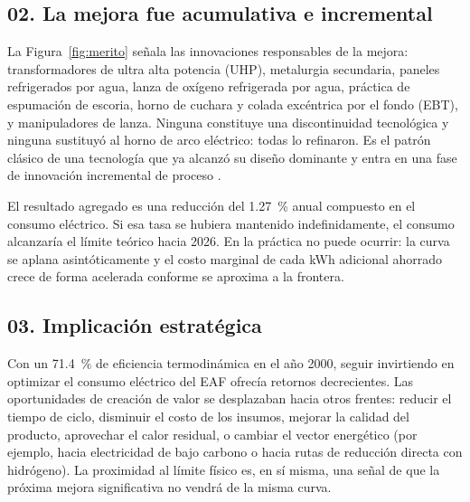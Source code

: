 \documentclass[11pt,letterpaper]{article}
\begin{document}
\subsection*{02. La mejora fue acumulativa e incremental}

La Figura~\ref{fig:merito} señala las innovaciones responsables de la mejora:
transformadores de ultra alta potencia (UHP), metalurgia secundaria, paneles
refrigerados por agua, lanza de oxígeno refrigerada por agua, práctica de
espumación de escoria, horno de cuchara y colada excéntrica por el fondo (EBT),
y manipuladores de lanza. Ninguna constituye una discontinuidad tecnológica y
ninguna sustituyó al horno de arco eléctrico: todas lo refinaron. Es el patrón clásico de una tecnología que ya
alcanzó su diseño dominante y entra en una fase de innovación incremental de
proceso \parencite{utterback1994,madias2014}.

El resultado agregado es una reducción del \SI{1.27}{\percent} anual compuesto
en el consumo eléctrico. Si esa tasa se hubiera mantenido indefinidamente, el
consumo alcanzaría el límite teórico hacia 2026. En la práctica no puede
ocurrir: la curva se aplana asintóticamente y el costo marginal de cada
kWh adicional ahorrado crece de forma acelerada conforme se aproxima a la
frontera.

\subsection*{03. Implicación estratégica}

Con un \SI{71.4}{\percent} de eficiencia termodinámica en el año 2000, seguir
invirtiendo en optimizar el consumo eléctrico del EAF ofrecía retornos
decrecientes. Las oportunidades de creación de valor se desplazaban hacia otros
frentes: reducir el tiempo de ciclo, disminuir el costo de los insumos, mejorar
la calidad del producto, aprovechar el calor residual, o cambiar el vector
energético (por ejemplo, hacia electricidad de bajo carbono o hacia rutas de
reducción directa con hidrógeno). La proximidad al límite físico es, en sí
misma, una señal de que la próxima mejora significativa no vendrá de la misma
curva.
\end{document}
